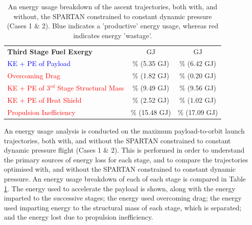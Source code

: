 \begin{table}[ht]
\begin{tabular}{l c c}
		\textbf{Third Stage Fuel Exergy}  
		& \textbf{\thirdEnergyConstqNoReturn}  GJ & \textbf{\thirdEnergyStandardNoReturn}  GJ
		\\
		\textcolor{blue}{KE + PE of Payload}  
		&\thirddExergyEffConstqNoReturn \% (5.35 GJ) &\thirddExergyEffStandardNoReturn \% (6.42 GJ)
		\\
		\textcolor{red}{Overcoming Drag}  
		& \WDthreeConstqNoReturn \% (1.82 GJ) & \WDthreeStandardNoReturn \% (0.20 GJ)
		\\
		\textcolor{red}{KE + PE  of 3$^{rd}$ Stage Structural Mass}  
		& \WthreeConstqNoReturn \% (9.49 GJ) & \WthreeStandardNoReturn \% (9.56 GJ)
		\\
		
		\textcolor{red}{KE + PE of Heat Shield}  
		
		& \WHSthreeConstqNoReturn \% (2.52 GJ) & \WHSthreeStandardNoReturn \% (1.02 GJ)
		\\
		
		\textcolor{red}{Propulsion Inefficiency}  
		& \PlossthreeCombinedConstqNoReturn \% (15.48 GJ) & \PlossthreeCombinedStandardNoReturn \% (17.09 GJ)
		\\
		\hline 
	\end{tabular} 
	\caption{An energy usage breakdown of the ascent trajectories, both with, and without, the SPARTAN constrained to constant dynamic pressure (Cases 1 \& 2). Blue indicates a 'productive' energy usage, whereas red indicates energy 'wastage'.}
	\label{tab:effStandardNoReturn}
\end{table}



An energy usage analysis is conducted on the maximum payload-to-orbit launch trajectories, both with, and without the SPARTAN constrained to constant dynamic pressure flight (Cases 1 \& 2). This is performed in order to understand the primary sources of energy loss for each stage, and to compare the trajectories optimised with, and without the SPARTAN constrained to constant dynamic pressure. An energy usage breakdown of each of each stage is compared in Table \ref{tab:effStandardNoReturn}. The energy used to accelerate the payload is shown, along with the energy imparted to the successive stages; the energy used overcoming drag; the energy used imparting energy to the structural mass of each stage, which is separated; and the energy lost due to propulsion inefficiency. 

